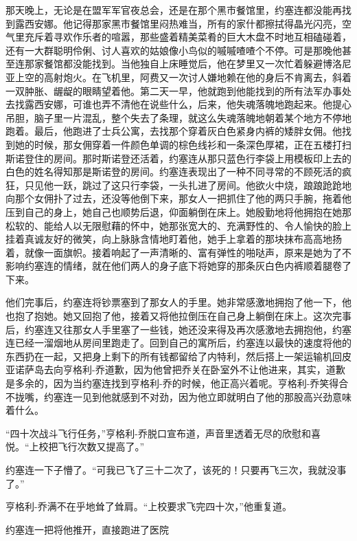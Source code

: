     那天晚上，无论是在盟军军官夜总会，还是在那个黑市餐馆里，约塞连都没能再找到露西安娜。他记得那家黑市餐馆里闷热难当，所有的家什都擦拭得晶光闪亮，空气里充斥着寻欢作乐者的喧嚣，那些盛着精美菜肴的巨大木盘不时地互相磕碰着，还有一大群聪明伶俐、讨人喜欢的姑娘像小鸟似的嘁嘁喳喳个不停。可是那晚他甚至连那家餐馆都没能找到。当他独自上床睡觉后，他在梦里又一次忙着躲避博洛尼亚上空的高射炮火。在飞机里，阿费又一次讨人嫌地赖在他的身后不肯离去，斜着一双肿胀、龌龊的眼睛望着他。第二天一早，他就跑到他能找到的所有法军办事处去找露西安娜，可谁也弄不清他在说些什么，后来，他失魂落魄地跑起来。他提心吊胆，脑子里一片混乱，整个失去了条理，就这么失魂落魄地朝着某个地方不停地跑着。最后，他跑进了士兵公寓，去找那个穿着灰白色紧身内裤的矮胖女佣。他找到她的时候，那女佣穿着一件颜色单调的棕色线衫和一条深色厚裙，正在五楼打扫斯诺登住的房间。那时斯诺登还活着，约塞连从那只蓝色行李袋上用模板印上去的白色的姓名得知那是斯诺登的房间。约塞连表现出了一种不同寻常的不顾死活的疯狂，只见他一跃，跳过了这只行李袋，一头扎进了房间。他欲火中烧，踉踉跄跄地向那个女佣扑了过去，还没等他倒下来，那女人一把抓住了他的两只手腕，拖着他压到自己的身上，她自己也顺势后退，仰面躺倒在床上。她殷勤地将他拥抱在她那松软的、能给人以无限慰藉的怀中，她那张宽大的、充满野性的、令人愉快的脸上挂着真诚友好的微笑，向上脉脉含情地盯着他，她手上拿着的那块抹布高高地扬着，就像一面旗帜。接着响起了一声清晰的、富有弹性的啪哒声，原来是她为了不影响约塞连的情绪，就在他们两人的身子底下将她穿的那条灰白色内裤顺着腿卷了下来。

    他们完事后，约塞连将钞票塞到了那女人的手里。她非常感激地拥抱了他一下，他也抱了抱她。她又回抱了他，接着又将他拉倒压在自己身上躺倒在床上。这次完事后，约塞连又往那女人手里塞了一些钱，她还没来得及再次感激地去拥抱他，约塞连已经一溜烟地从房间里跑走了。回到自己的寓所后，约塞连以最快的速度将他的东西扔在一起，又把身上剩下的所有钱都留给了内特利，然后搭上一架运输机回皮亚诺萨岛去向亨格利-乔道歉，因为他曾把乔关在卧室外不让他进来，其实，道歉是多余的，因为当约塞连找到亨格利-乔的时候，他正高兴着呢。亨格利-乔笑得合不拢嘴，约塞连一见到他就感到不对劲，因为他立即就明白了他的那股高兴劲意味着什么。

    “四十次战斗飞行任务，”亨格利-乔脱口宣布道，声音里透着无尽的欣慰和喜悦。“上校把飞行次数又提高了。”

    约塞连一下子懵了。“可我已飞了三十二次了，该死的！只要再飞三次，我就没事了。”

    亨格利-乔满不在乎地耸了耸肩。“上校要求飞完四十次，”他重复道。

    约塞连一把将他推开，直接跑进了医院
